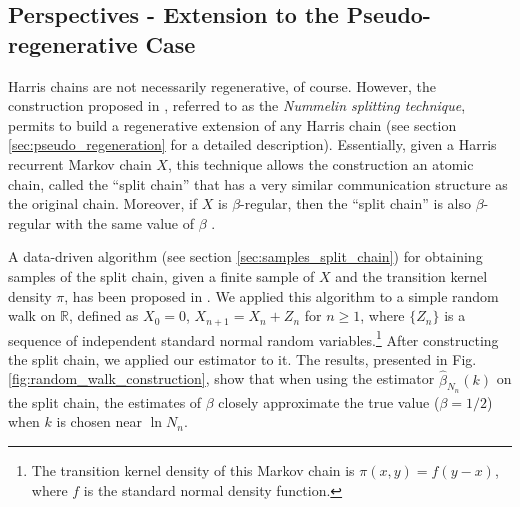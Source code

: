 \documentclass[sn-mathphys-ay]{sn-jnl}%
\newcommand{\R}{\mathbb{R}}
\begin{document}
\subsection{Perspectives - Extension to the Pseudo-regenerative Case}\label{subsec:extension_nummelin}

Harris chains are not necessarily regenerative, of course. However, the construction
proposed in \cite{Nummelin1978, Nummelin1984}, referred to as the \textit{Nummelin
    splitting technique}, permits to build a regenerative extension of any Harris chain (see
section \ref{sec:pseudo_regeneration} for a detailed description). Essentially, given a
Harris recurrent Markov chain \(X\), this technique allows the construction an atomic
chain, called the ``split chain'' that has a very similar communication structure as the
original chain. Moreover, if \(X\) is \(\beta\)-regular, then the ``split chain'' is also
\(\beta\)-regular with the same value of \(\beta\) \cite[pp. 19]{Chen1999}.

A data-driven algorithm (see section \ref{sec:samples_split_chain}) for obtaining samples
of the split chain, given a finite sample of \(X\) and the transition kernel density
\(\pi\), has been proposed in \cite{BertailClemencon2006}. We applied this algorithm to a
simple random walk on $\R$, defined as $X_0=0$, $X_{n+1}=X_{n}+Z_n$ for $n\geq 1$, where
$\{Z_n\}$ is a sequence of independent standard normal random variables.\footnote{The
    transition kernel density of this Markov chain is $\pi(x,y)=f(y-x)$, where $f$ is the
    standard normal density function.} After constructing the split chain, we applied our
estimator to it. The results, presented in Fig. \ref{fig:random_walk_construction}, show
that when using the estimator $\widehat{\beta}_{N_n}(k)$ on the split chain, the
estimates of $\beta$ closely approximate the true value ($\beta=1/2$) when $k$ is chosen
near $\ln N_{n}$.
\end{document}
